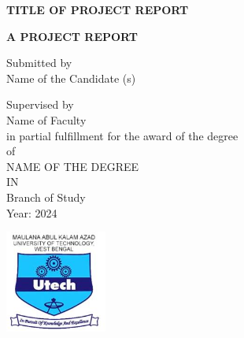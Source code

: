 \documentclass[12pt]{report}
\begin{document}
\begin{titlepage}
\begin{center}

\textbf{ {\fontsize{18pt}{12pt}\selectfont TITLE OF PROJECT REPORT}}
        
\vspace{0.5cm}
        
\textbf{ {\fontsize{14pt}{12pt}\selectfont A PROJECT REPORT}}

\vspace{1.5cm}

 {\fontsize{14pt}{12pt}\selectfont Submitted by}\\
 \vspace{0.5cm}
 {\fontsize{16pt}{12pt}\selectfont Name of the Candidate (s)
 }\\       
\vspace{1.5cm}

{\fontsize{14pt}{12pt}\selectfont Supervised by}\\
\vspace{0.5cm}
{\fontsize{14pt}{12pt}\selectfont Name of Faculty
}\\
\vspace{0.5cm}
{\fontsize{14pt}{12pt}\selectfont in partial fulfillment for the award of the degree}\\
\vspace{0.5cm}
{\fontsize{14pt}{12pt}\selectfont of}\\
\vspace{0.5cm}
{\fontsize{14pt}{12pt}\selectfont NAME OF THE DEGREE 
}\\
\vspace{0.5cm}
{\fontsize{14pt}{12pt}\selectfont IN}\\
\vspace{0.5cm}
{\fontsize{14pt}{12pt}\selectfont Branch of Study}\\
\vspace{0.5cm}
{\fontsize{14pt}{12pt}\selectfont Year: 2024}\\

\vfill
       
\vspace{0.3cm}
        
\includegraphics[width=0.25\textwidth]{Makaut_logo.jpg}
        

\end{center}
\end{titlepage}
\end{document}
